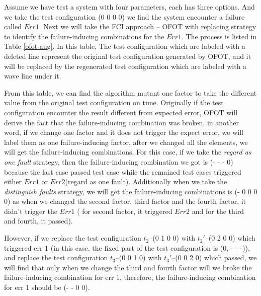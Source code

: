\documentclass{sig-alternate}
\begin{document}
Assume we have test a system with four parameters, each has three options. And we take the test configuration (0 0 0 0) we find the system encounter a failure called $Err 1$. Next we will take the FCI approach -- OFOT with replacing strategy to identify the failure-inducing combinations for the $Err 1$. The process is listed in Table \ref{ofot-aug}. In this table, The test configuration which are labeled with a deleted line represent the original test configuration generated by OFOT, and it will be replaced by the regenerated test configuration which are labeled with a wave line under it.

From this table, we can find the algorithm mutant one factor to take the different value from the original test configuration on time. Originally if the test configuration encounter the result different from expected error, OFOT will derive the fact that the failure-inducing combination was broken, in another word, if we change one factor and it does not trigger the expect error, we will label them as one failure-inducing factor, after we changed all the elements, we will get the failure-inducing combinations. For this case, if we take the \emph{regard as one fault} strategy, then the failure-inducing combination we got is (- - - 0) because the last case passed test case while the remained test cases triggered either $Err 1$ or $Err 2$(regard as one fault).  Additionally when we take the \emph{distinguish faults} strategy, we will get the failure-inducing combinations is (- 0 0 0 0) as when we changed the second factor, third factor and the fourth factor, it didn't trigger the $Err 1$ ( for second factor, it triggered $Err 2$ and for the third and fourth, it passed).


However, if we replace the test configuration $t_{2}$--(0 1 0 0) with $t_{2}'$--(0 2 0 0) which triggered err 1 (in this case, the fixed part of the test configuration is (0, - - -)), and replace the test configuration $t_{3}$--(0 0 1 0) with $t_{3}'$--(0 0 2 0) which passed, we will find that only when we change the third and fourth factor will we broke the failure-inducing combination for err 1, therefore,  the failure-inducing combination for err 1 should be (- - 0 0).
\end{document}
